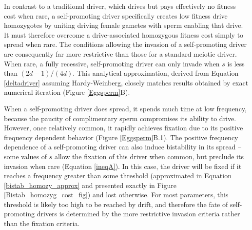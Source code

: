 \documentclass[12pt,letterpaper]{article}
\begin{document}
In contrast to a traditional driver, which drives but pays effectively
	no fitness cost when rare, 
a self-promoting driver specifically creates low fitness drive homozygotes 
	by uniting driving female gametes with sperm enabling that drive.
It must therefore overcome a drive-associated homozygous fitness cost simply to spread when rare. 
The conditions allowing the invasion of a self-promoting driver
 	are consequently far more restrictive than those for a standard meiotic driver.
When rare, a fully recessive, self-promoting driver can only invade when $s$ 
	is less than $(2 d - 1)/(4 d)$. 
This analytical approximation, derived from Equation \eqref{deltadriver} assuming Hardy-Weinberg, 
	closely matches results obtained by exact numerical iteration (Figure \ref{Eggsperm}B). 


When a self-promoting driver does spread, 
	it spends much time at low frequency, 
	because the paucity of complimentary sperm compromises its ability to drive. 
However, once relatively common, it  rapidly achieves fixation due to its
	positive frequency dependent behavior (Figure \ref{Eggsperm}B.1).  
The positive frequency dependence of a self-promoting driver can also
	induce bistability in its spread -- some values of $s$ 
	allow the fixation of this driver when common, but 
	preclude its invasion when rare (Equation \ref{ineqA}). 
In this case, the driver will be fixed if it reaches a frequency greater than some threshold 
	(approximated in Equation \ref{bistab_homozy_approx} and  presented exactly in 
	Figure \ref{Bistab_homozyg_cost_fig}) and lost otherwise. 
For most parameters, this threshold is likely too high to be reached by drift, 
	and therefore  the fate of self-promoting drivers is determined
	by the more restrictive invasion criteria rather than the fixation criteria. 
\end{document}
